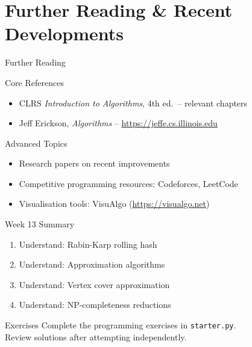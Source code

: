 \documentclass[aspectratio=169,xcolor=dvipsnames]{beamer}
\begin{document}
\section{Further Reading \& Recent Developments}
\begin{frame}{Further Reading}
  \begin{block}{Core References}
    \begin{itemize}
      \item CLRS \textit{Introduction to Algorithms}, 4th ed.\ -- relevant chapters
      \item Jeff Erickson, \textit{Algorithms} -- \url{https://jeffe.cs.illinois.edu}
    \end{itemize}
  \end{block}
  \begin{exampleblock}{Advanced Topics}
    \begin{itemize}
      \item Research papers on recent improvements
      \item Competitive programming resources: Codeforces, LeetCode
      \item Visualisation tools: VisuAlgo (\url{https://visualgo.net})
    \end{itemize}
  \end{exampleblock}
\end{frame}

\begin{frame}{Week 13 Summary}
  \begin{enumerate}
    \item Understand: Rabin-Karp rolling hash
    \item Understand: Approximation algorithms
    \item Understand: Vertex cover approximation
    \item Understand: NP-completeness reductions
  \end{enumerate}
  \begin{block}{Exercises}
    Complete the programming exercises in \texttt{starter.py}.\\
    Review solutions after attempting independently.
  \end{block}
\end{frame}
\end{document}
